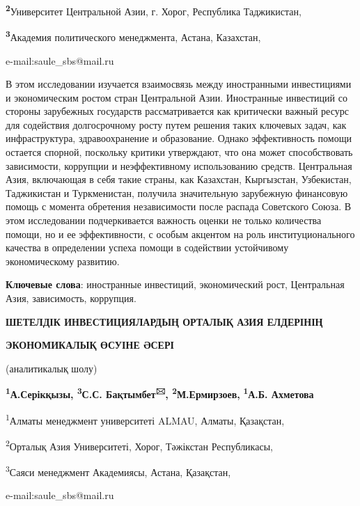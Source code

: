 {\bfseries \textsuperscript{2}}Университет Центральной Азии, г. Хорог,
Республика Таджикистан,

{\bfseries \textsuperscript{3}}Академия политического менеджмента, Астана,
Казахстан,

e-mail:saule\_sbs@mail.ru

В этом исследовании изучается взаимосвязь между иностранными
инвестициями и экономическим ростом стран Центральной Азии. Иностранные
инвестиций со стороны зарубежных государств рассматривается как
критически важный ресурс для содействия долгосрочному росту путем
решения таких ключевых задач, как инфраструктура, здравоохранение и
образование. Однако эффективность помощи остается спорной, поскольку
критики утверждают, что она может способствовать зависимости, коррупции
и неэффективному использованию средств. Центральная Азия, включающая в
себя такие страны, как Казахстан, Кыргызстан, Узбекистан, Таджикистан и
Туркменистан, получила значительную зарубежную финансовую помощь с
момента обретения независимости после распада Советского Союза. В этом
исследовании подчеркивается важность оценки не только количества помощи,
но и ее эффективности, с особым акцентом на роль институционального
качества в определении успеха помощи в содействии устойчивому
экономическому развитию.

{\bfseries Ключевые слова}: иностранные инвестиций, экономический рост,
Центральная Азия, зависимость, коррупция.

{\bfseries ШЕТЕЛДІК ИНВЕСТИЦИЯЛАРДЫҢ ОРТАЛЫҚ АЗИЯ ЕЛДЕРІНІҢ}

{\bfseries ЭКОНОМИКАЛЫҚ ӨСУІНЕ ӘСЕРІ}

(аналитикалық шолу)

{\bfseries \textsuperscript{1}А.Серікқызы, \textsuperscript{3}С.С.
Бақтымбет\textsuperscript{🖂}, \textsuperscript{2}М.Ермирзоев,}
{\bfseries \textsuperscript{1}А.Б. Ахметова}

\textsuperscript{1}Алматы менеджмент университеті ALMAU, Алматы,
Қазақстан,

\textsuperscript{2}Орталық Азия Университеті, Хорог, Тәжікстан
Республикасы,

\textsuperscript{3}Саяси менеджмент Академиясы, Астана, Қазақстан,

e-mail:saule\_sbs@mail.ru

